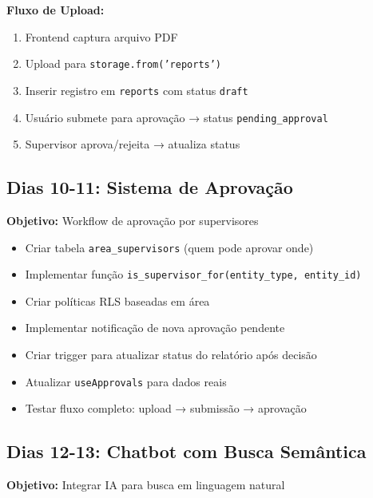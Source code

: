 \documentclass[12pt,a4paper]{article}
\newcommand{\checkbox}{$\square$}
\begin{document}
\textbf{Fluxo de Upload:}
\begin{enumerate}
    \item Frontend captura arquivo PDF
    \item Upload para \texttt{storage.from('reports')}
    \item Inserir registro em \texttt{reports} com status \texttt{draft}
    \item Usuário submete para aprovação → status \texttt{pending\_approval}
    \item Supervisor aprova/rejeita → atualiza status
\end{enumerate}

\subsection{Dias 10-11: Sistema de Aprovação}

\begin{tcolorbox}[colback=green!5!white,colframe=neogreen]
\textbf{Objetivo:} Workflow de aprovação por supervisores
\end{tcolorbox}

\begin{itemize}[label=\checkbox]
    \item Criar tabela \texttt{area\_supervisors} (quem pode aprovar onde)
    \item Implementar função \texttt{is\_supervisor\_for(entity\_type, entity\_id)}
    \item Criar políticas RLS baseadas em área
    \item Implementar notificação de nova aprovação pendente
    \item Criar trigger para atualizar status do relatório após decisão
    \item Atualizar \texttt{useApprovals} para dados reais
    \item Testar fluxo completo: upload → submissão → aprovação
\end{itemize}

\subsection{Dias 12-13: Chatbot com Busca Semântica}

\begin{tcolorbox}[colback=green!5!white,colframe=neogreen]
\textbf{Objetivo:} Integrar IA para busca em linguagem natural
\end{tcolorbox}
\end{document}
